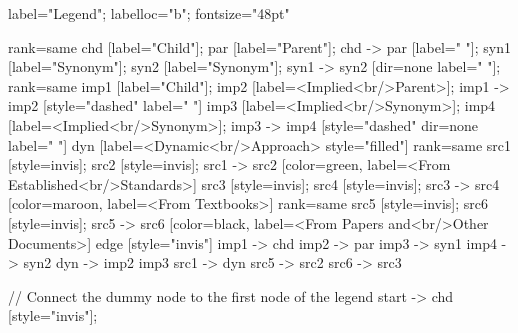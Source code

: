 \documentclass{article}
\begin{document}
{{    label="Legend";
    labelloc="b";
    fontsize="48pt"

    {
        rank=same
        chd [label="Child"];
        par [label="Parent"];
        chd -> par [label="                "];
        syn1 [label="Synonym"];
        syn2 [label="Synonym"];
        syn1 -> syn2 [dir=none label="                "];
    }
    {
        rank=same
        imp1 [label="Child"];
        imp2 [label=<Implied<br/>Parent>];
        imp1 -> imp2 [style="dashed" label="                "]
        imp3 [label=<Implied<br/>Synonym>];
        imp4 [label=<Implied<br/>Synonym>];
        imp3 -> imp4 [style="dashed" dir=none label="                "]
    }
        dyn [label=<Dynamic<br/>Approach> style="filled"]
{
rank=same
src1 [style=invis];
src2 [style=invis];
src1 -> src2 [color=green, label=<From Established<br/>Standards>]
src3 [style=invis];
src4 [style=invis];
src3 -> src4 [color=maroon, label=<From Textbooks>]
}
{
rank=same
src5 [style=invis];
src6 [style=invis];
src5 -> src6 [color=black, label=<From Papers and<br/>Other Documents>]
}
edge [style="invis"]
imp1 -> chd
imp2 -> par
imp3 -> syn1
imp4 -> syn2
dyn -> { imp2 imp3 }
src1 -> dyn
src5 -> src2
src6 -> src3
}

// Connect the dummy node to the first node of the legend
start -> chd [style="invis"];
}
\end{document}
